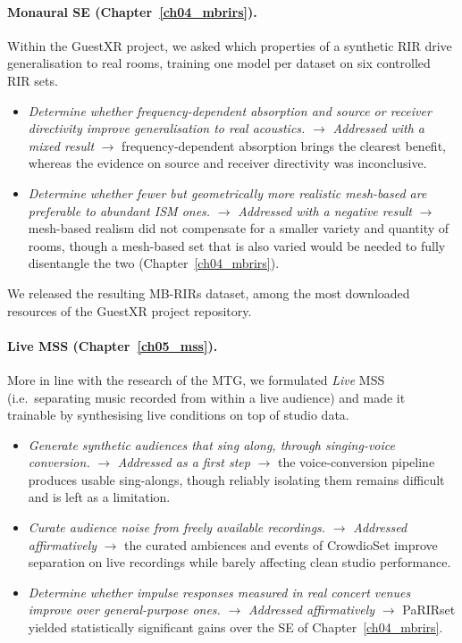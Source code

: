 \paragraph{Monaural \acrfull{SE} (Chapter~\ref{ch04_mbrirs}).}
Within the GuestXR project, we asked which properties of a synthetic
\acrshort{RIR} drive generalisation to real rooms, training one model per
dataset on six controlled \acrshort{RIR} sets.
\begin{itemize}
    \item[\RO{3}] \emph{Determine whether frequency-dependent absorption
    and source or receiver directivity improve generalisation to real
    acoustics.} $\rightarrow$ \textit{Addressed with a mixed result}
    $\rightarrow$ frequency-dependent absorption brings the clearest benefit,
    whereas the evidence on source and receiver directivity was inconclusive.
    \item[\RO{4}] \emph{Determine whether fewer but geometrically more
    realistic mesh-based  are preferable to abundant \acrfull{ISM}
    ones.} $\rightarrow$ \textit{Addressed with a negative result} $\rightarrow$
    mesh-based realism did not compensate for a smaller variety and quantity of
    rooms, though a mesh-based set that is also varied would be needed to fully
    disentangle the two (Chapter~\ref{ch04_mbrirs}).
\end{itemize}
We released the resulting MB-RIRs dataset, among the most downloaded resources
of the GuestXR project repository.

\paragraph{Live \acrfull{MSS} (Chapter~\ref{ch05_mss}).}
More in line with the research of the \acrshort{MTG}, we formulated \emph{Live}
\acrshort{MSS} (i.e.\ separating music recorded from within a live audience) and
made it trainable by synthesising live conditions on top of studio data.
\begin{itemize}
    \item[\RO{5}] \emph{Generate synthetic audiences that sing along,
    through singing-voice conversion.} $\rightarrow$ \textit{Addressed as a first
    step} $\rightarrow$ the voice-conversion pipeline produces usable
    sing-alongs, though reliably isolating them remains difficult and is left as
    a limitation.
    \item[\RO{6}] \emph{Curate audience noise from freely available
    recordings.} $\rightarrow$ \textit{Addressed affirmatively} $\rightarrow$ the
    curated ambiences and events of CrowdioSet improve separation on live
    recordings while barely affecting clean studio performance.
    \item[\RO{7}] \emph{Determine whether impulse responses measured in
    real concert venues improve over general-purpose ones.} $\rightarrow$
    \textit{Addressed affirmatively} $\rightarrow$ PaRIRset yielded statistically
    significant gains over the \acrshort{SE}  of
    Chapter~\ref{ch04_mbrirs}.
\end{itemize}

